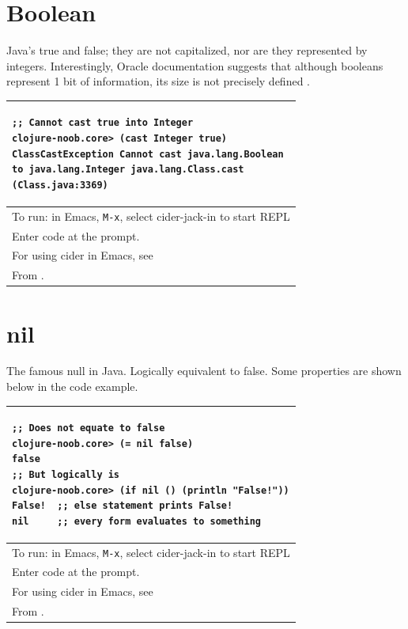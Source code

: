 \documentclass[12pt]{article}
\begin{document}
\part{Boolean}
Java's true and false; they are not capitalized, nor are they represented by integers. Interestingly, Oracle documentation suggests that although booleans represent 1 bit of information, its size is not precisely defined \cite{oraclechar}.

\begin{tabular}{|p{}|}
\hline
\begin{verbatim}
;; Cannot cast true into Integer
clojure-noob.core> (cast Integer true)
ClassCastException Cannot cast java.lang.Boolean
to java.lang.Integer java.lang.Class.cast 
(Class.java:3369)
\end{verbatim}
\\
\hline
To run: in Emacs, \texttt{M-x}, select cider-jack-in to start REPL\\
Enter code at the prompt.\\
For using cider in Emacs, see \cite{brave2015}\\
\hline
From \cite{rathore2011clojure}.\\
\hline
\end{tabular}


\part{nil}
The famous null in Java. Logically equivalent to false. Some properties are shown below in the code example.

\begin{tabular}{|p{}|}
\hline
\begin{verbatim}
;; Does not equate to false
clojure-noob.core> (= nil false)
false
;; But logically is
clojure-noob.core> (if nil () (println "False!"))
False!  ;; else statement prints False!
nil     ;; every form evaluates to something
\end{verbatim}
\\
\hline
To run: in Emacs, \texttt{M-x}, select cider-jack-in to start REPL\\
Enter code at the prompt.\\
For using cider in Emacs, see \cite{brave2015}\\
\hline
From \cite{rathore2011clojure}.\\
\hline
\end{tabular}
\end{document}
